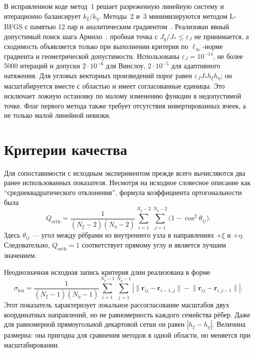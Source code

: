 \documentclass[11pt,a4paper]{article}
\newcommand{\vect}[1]{\boldsymbol{#1}}
\begin{document}
В исправленном коде метод~1 решает разреженную линейную систему и
итерационно балансирует \(k_\xi/k_\eta\). Методы~2 и~3 минимизируются
методом L-BFGS с памятью 12 пар и аналитическим
градиентом~\cite{liu1989}. Реализован явный допустимый поиск шага
Армихо~\cite{armijo1966}: пробная точка с
\(J_q/J_*\le\varepsilon_J\) не принимается, а сходимость объявляется только
при выполнении критерия по \(\ell_\infty\)-норме градиента и
геометрической допустимости. Использованы
\(\varepsilon_J=10^{-14}\), не более 5000
итераций и допуски \(2\cdot10^{-6}\) для Винслоу,
\(2\cdot10^{-5}\) для адаптивного натяжения. Для угловых векторных
произведений порог равен
\(\varepsilon_JJ_*h_\xi h_\eta\); он масштабируется вместе с областью и
имеет согласованные единицы. Это исключает ложную остановку по малому
изменению функции в недопустимой точке. Флаг первого метода также
требует отсутствия инвертированных ячеек, а не только малой линейной
невязки.

\section{Критерии качества}

Для сопоставимости с исходным экспериментом \cite{khalilov2024} прежде
всего вычисляются два ранее использованных показателя. Несмотря на
исходное словесное описание как
``среднеквадратического отклонения'', формула коэффициента
ортогональности была
\begin{equation}
Q_{\mathrm{orth}}=
\frac{1}{(N_\xi-2)(N_\eta-2)}
\sum_{i=1}^{N_\xi-2}\sum_{j=1}^{N_\eta-2}
\bigl(1-\cos^2\theta_{ij}\bigr).
\label{eq:qorth}
\end{equation}
Здесь \(\theta_{ij}\) --- угол между рёбрами из внутреннего узла в
направлениях \(+\xi\) и \(+\eta\). Следовательно,
\(Q_{\mathrm{orth}}=1\) соответствует прямому углу и является лучшим
значением.

Неоднозначная исходная запись критерия длин реализована в форме
\begin{equation}
\sigma_{\mathrm{len}}=
\frac{1}{(N_\xi-1)(N_\eta-1)}
\sum_{i=1}^{N_\xi-1}\sum_{j=1}^{N_\eta-1}
\left|
\lVert\vect r_{ij}-\vect r_{i-1,j}\rVert-
\lVert\vect r_{ij}-\vect r_{i,j-1}\rVert
\right|.
\label{eq:len}
\end{equation}
Этот показатель характеризует локальное рассогласование масштабов двух
координатных направлений, но не равномерность каждого семейства рёбер.
Даже для равномерной прямоугольной декартовой сетки он равен
\(|h_\xi-h_\eta|\). Величина размерна: она пригодна для сравнения
методов в одной области, но меняется при масштабировании.
\end{document}
